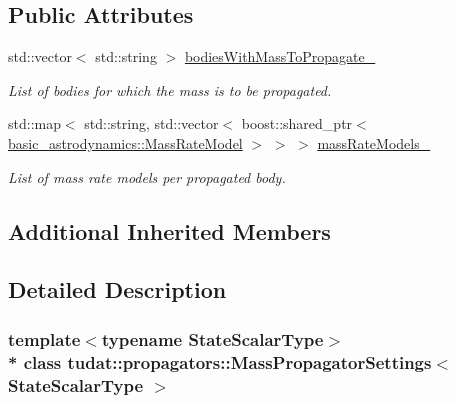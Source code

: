 \subsection*{Public Attributes}
\begin{DoxyCompactItemize}
\item 
std\+::vector$<$ std\+::string $>$ \hyperlink{classtudat_1_1propagators_1_1MassPropagatorSettings_a0aa96b2683fb7c9486f351e4b0416018}{bodies\+With\+Mass\+To\+Propagate\+\_\+}\hypertarget{classtudat_1_1propagators_1_1MassPropagatorSettings_a0aa96b2683fb7c9486f351e4b0416018}{}\label{classtudat_1_1propagators_1_1MassPropagatorSettings_a0aa96b2683fb7c9486f351e4b0416018}

\begin{DoxyCompactList}\small\item\em List of bodies for which the mass is to be propagated. \end{DoxyCompactList}\item 
std\+::map$<$ std\+::string, std\+::vector$<$ boost\+::shared\+\_\+ptr$<$ \hyperlink{classtudat_1_1basic__astrodynamics_1_1MassRateModel}{basic\+\_\+astrodynamics\+::\+Mass\+Rate\+Model} $>$ $>$ $>$ \hyperlink{classtudat_1_1propagators_1_1MassPropagatorSettings_a349afec568bc06d827f2400c77e4b5ab}{mass\+Rate\+Models\+\_\+}\hypertarget{classtudat_1_1propagators_1_1MassPropagatorSettings_a349afec568bc06d827f2400c77e4b5ab}{}\label{classtudat_1_1propagators_1_1MassPropagatorSettings_a349afec568bc06d827f2400c77e4b5ab}

\begin{DoxyCompactList}\small\item\em List of mass rate models per propagated body. \end{DoxyCompactList}\end{DoxyCompactItemize}
\subsection*{Additional Inherited Members}


\subsection{Detailed Description}
\subsubsection*{template$<$typename State\+Scalar\+Type$>$\\*
class tudat\+::propagators\+::\+Mass\+Propagator\+Settings$<$ State\+Scalar\+Type $>$}

